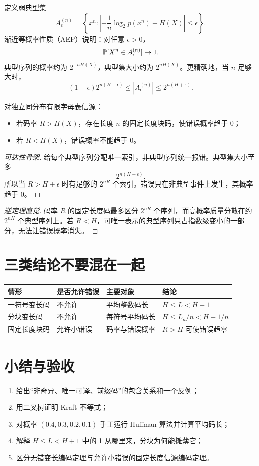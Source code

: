 定义弱典型集
\[
A_\epsilon^{(n)}=
\left\{x^n:
\left|-\frac1n\log_2p(x^n)-H(X)\right|\le\epsilon
\right\}.
\]
渐近等概率性质（AEP）说明：对任意 $\epsilon>0$，
\[
\mathbb{P}[X^n\in A_\epsilon^{(n)}]\to1.
\]
典型序列的概率约为 $2^{-nH(X)}$，典型集大小约为 $2^{nH(X)}$。更精确地，当 $n$ 足够大时，
\[
(1-\epsilon)2^{n(H-\epsilon)}
\le |A_\epsilon^{(n)}|
\le 2^{n(H+\epsilon)}.
\]

\begin{theorem}[几乎无失真固定长度信源编码]
对独立同分布有限字母表信源：
\begin{itemize}
  \item 若码率 $R>H(X)$，存在长度 $n$ 的固定长度块码，使错误概率趋于 0；
  \item 若 $R<H(X)$，错误概率不能趋于 0。
\end{itemize}
\end{theorem}

\begin{proof}[可达性骨架]
给每个典型序列分配唯一索引，非典型序列统一报错。典型集大小至多
\[
2^{n(H+\epsilon)}.
\]
所以当 $R>H+\epsilon$ 时有足够的 $2^{nR}$ 个索引。错误只在非典型事件上发生，其概率趋于 0。
\end{proof}

\begin{proof}[逆定理直觉]
码率 $R$ 的固定长度码最多区分 $2^{nR}$ 个序列，而高概率质量分散在约 $2^{nH}$ 个典型序列上。若 $R<H$，可唯一表示的典型序列只占指数级变小的一部分，无法让错误概率消失。
\end{proof}

\section{三类结论不要混在一起}

\begin{center}
\begin{tabularx}{\textwidth}{lXXX}
\toprule
情形 & 是否允许错误 & 主要对象 & 结论\\
\midrule
一符号变长码 & 不允许 & 平均整数码长 & $H\le L<H+1$\\
分块变长码 & 不允许 & 每符号平均码长 & $H\le L_n/n<H+1/n$\\
固定长度块码 & 允许小错误 & 码率与错误概率 & $R>H$ 可使错误趋零\\
\bottomrule
\end{tabularx}
\end{center}

\section{小结与验收}

\begin{checkpointbox}
\begin{enumerate}
  \item 给出“非奇异、唯一可译、前缀码”的包含关系和一个反例；
  \item 用二叉树证明 Kraft 不等式；
  \item 对概率 $(0.4,0.3,0.2,0.1)$ 手工运行 Huffman 算法并计算平均码长；
  \item 解释 $H\le L<H+1$ 中的 1 从哪里来，分块为何能摊薄它；
  \item 区分无错变长编码定理与允许小错误的固定长度信源编码定理。
\end{enumerate}
\end{checkpointbox}
